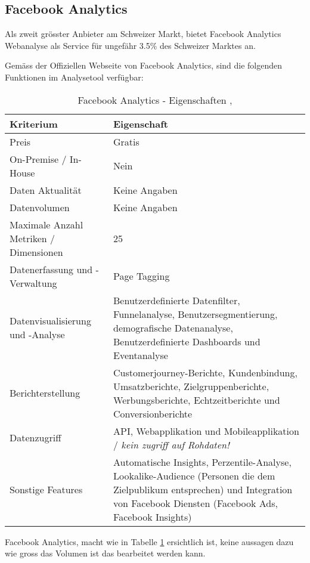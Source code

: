 \subsection{Facebook Analytics}

Als zweit grösster Anbieter am Schweizer Markt, bietet Facebook Analytics Webanalyse als Service für ungefähr 3.5\% des Schweizer Marktes an.

Gemäss der Offiziellen Webseite von Facebook Analytics, sind die folgenden Funktionen im Analysetool verfügbar:

\begin{table}[h]
	\centering
	\begin{tabular}{ | p{4cm} | p{10cm} |}
		\hline
		\textbf{Kriterium} & \textbf{Eigenschaft}  \\ 
		\hline
    Preis & Gratis \\
    \hline
    On-Premise / In-House & Nein \\
    \hline
    Daten Aktualität & Keine Angaben \\
    \hline
		Datenvolumen & Keine Angaben \\
    \hline
    Maximale Anzahl Metriken / Dimensionen & 25 \\
    \hline
		Datenerfassung und -Verwaltung &  Page Tagging \\
    \hline
    Datenvisualisierung und -Analyse & Benutzerdefinierte Datenfilter, Funnelanalyse, Benutzersegmentierung,  demografische Datenanalyse, Benutzerdefinierte Dashboards und Eventanalyse \\
    \hline
    Berichterstellung & Customerjourney-Berichte, Kundenbindung, Umsatzberichte, Zielgruppenberichte, Werbungsberichte, Echtzeitberichte und Conversionberichte \\
    \hline
    Datenzugriff & API, Webapplikation und Mobileapplikation / \textit{kein zugriff auf Rohdaten!}\\
    \hline
    Sonstige Features & Automatische Insights, Perzentile-Analyse, Lookalike-Audience (Personen die dem Zielpublikum entsprechen) und Integration von Facebook Diensten (Facebook Ads, Facebook Insights) \\
		\hline  
	\end{tabular}
	\caption{Facebook Analytics - Eigenschaften \parencite{facebookAnalyticsFeatures}, \parencite{facebookAnalyticsHelp}}
	\label{tab: facebookAnalyticsFeatures}
\end{table}

Facebook Analytics, macht wie in Tabelle \ref{tab: facebookAnalyticsFeatures} ersichtlich ist, keine aussagen dazu wie gross das Volumen ist das bearbeitet werden kann. 

